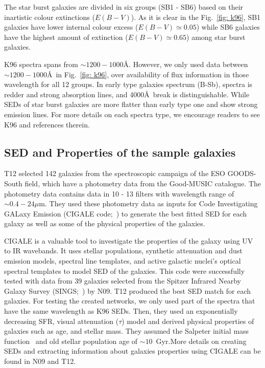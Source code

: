     The star burst galaxies are divided in six groups (SB1 - SB6) based on their inartistic colour extinctions ($E(B-V)$). 
    As it is clear in the Fig.~\ref{fig: k96}, SB1 galaxies have lower internal colour excess ($E(B-V) \simeq 0.05$) while SB6 galaxies have the highest amount of extinction ($E(B-V) \simeq 0.65$) among star burst galaxies.
    
    K96 spectra spans from $\sim1200-1000$\AA.
    However, we only used data between $\sim1200-1000$\AA~in Fig.~\ref{fig: k96}, over availability of flux information in those wavelength for all 12 groups.
    In early type galaxies spectrum (B-Sb), spectra is redder and strong absorption lines, and 4000\AA~break is distinguishable. 
    While SEDs of star burst galaxies are more flatter than early type one and show strong emission lines.
    For more details on each spectra type, we encourage readers to see K96 and references therein. 
    

 \subsection{SED and Properties of the sample galaxies}
    T12 selected 142 galaxies from the spectroscopic campaign of the ESO GOODS-South field, which have a photometry data from the Good-MUSIC catalogue. 
    The photometry data contains data in 10 - 13 filters with wavelength range of $\sim 0.4-24 \mu$m. 
    They used these photometry data as inputs for Code Investigating GALaxy Emission (CIGALE code;~\citep{Noll09}) to generate the best fitted SED for each galaxy as well as some of the physical properties of the galaxies.
    
    CIGALE is a valuable tool to investigate the properties of the galaxy using UV to IR wavebands.
    It uses stellar populations, synthetic attenuation and dust emission models, spectral line templates, and active galactic nuclei's optical spectral templates to model SED of the galaxies.
    This code were successfully tested with data from 39 galaxies selected from the Spitzer Infrared Nearby Galaxy Survey (SINGS;~\citep{Kennicutt03}) by N09.
    T12 produced the best SED match for each galaxies.
    For testing the created networks, we only used part of the spectra that have the same wavelength as K96 SEDs.
    Then, they used an exponentially decreasing SFR, visual attenuation ($\tau$) model and derived physical properties of galaxies such as age, and stellar mass.
    They assumed the Salpeter initial mass function~\citep{Salpeter55} and old stellar population age of $\sim 10$~Gyr.More details on creating SEDs and extracting information about galaxies properties using CIGALE can be found in N09 and T12.
    
    
